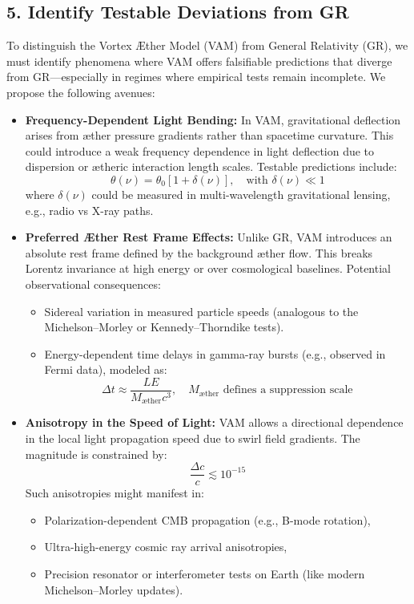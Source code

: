 \documentclass[a4paper, aps,preprint,superscriptaddress, 12pt]{revtex4}
\begin{document}
\subsection*{5. Identify Testable Deviations from GR}

To distinguish the Vortex Æther Model (VAM) from General Relativity (GR), we must identify phenomena where VAM offers falsifiable predictions that diverge from GR—especially in regimes where empirical tests remain incomplete. We propose the following avenues:

\begin{itemize}
    \item \textbf{Frequency-Dependent Light Bending:} In VAM, gravitational deflection arises from æther pressure gradients rather than spacetime curvature. This could introduce a weak frequency dependence in light deflection due to dispersion or ætheric interaction length scales. Testable predictions include:
    \[
    \theta(\nu) = \theta_0 \left[ 1 + \delta(\nu) \right], \quad \text{with } \delta(\nu) \ll 1
    \]
    where \( \delta(\nu) \) could be measured in multi-wavelength gravitational lensing, e.g., radio vs X-ray paths.

    \item \textbf{Preferred Æther Rest Frame Effects:} Unlike GR, VAM introduces an absolute rest frame defined by the background æther flow. This breaks Lorentz invariance at high energy or over cosmological baselines. Potential observational consequences:
    \begin{itemize}
        \item Sidereal variation in measured particle speeds (analogous to the Michelson–Morley or Kennedy–Thorndike tests).
        \item Energy-dependent time delays in gamma-ray bursts (e.g., observed in Fermi data), modeled as:
        \[
        \Delta t \approx \frac{L E}{M_\text{æther} c^3}, \quad M_\text{æther} \text{ defines a suppression scale}
        \]
    \end{itemize}

    \item \textbf{Anisotropy in the Speed of Light:} VAM allows a directional dependence in the local light propagation speed due to swirl field gradients. The magnitude is constrained by:
    \[
    \frac{\Delta c}{c} \lesssim 10^{-15}
    \]
    Such anisotropies might manifest in:
    \begin{itemize}
        \item Polarization-dependent CMB propagation (e.g., B-mode rotation),
        \item Ultra-high-energy cosmic ray arrival anisotropies,
        \item Precision resonator or interferometer tests on Earth (like modern Michelson–Morley updates).
    \end{itemize}
\end{itemize}
\end{document}
